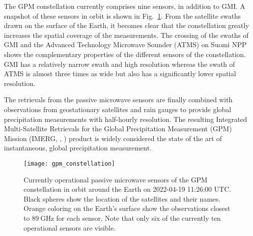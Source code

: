 The GPM constellation currently comprises nine sensors, in addition to GMI. A
snapshot of these sensors in orbit is shown in
Fig.~\ref{fig:radiative_transfer:gpm_constellation}. From the satellite swaths
drawn on the surface of the Earth, it becomes clear that the constellation
greatly increases the spatial coverage of the measurements. The crossing of the
swaths of GMI and the Advanced Technology Microwave Sounder (ATMS) on Suomi NPP
shows the complementary properties of the different sensors of the
constellation. GMI has a relatively narrow swath and high resolution whereas the
swath of ATMS is almost three times as wide but also has a significantly lower
spatial resolution.

The retrievals from the passive microwave sensors are finally combined with
observations from geostationary satellites and rain gauges to provide global
precipitation measurements with half-hourly resolution. The resulting Integrated
Multi-Satellite Retrievals for the Global Precipitation Measurement (GPM)
Mission (IMERG, \citeauthor{huffman20}, \citeyear{huffman20}) product is widely
considered the state of the art of instantaneous, global precipitation
measurement.


\begin{figure}[!hbpt]
\centering
\texttt{[image: gpm\_constellation]}
\caption{
Currently operational passive microwave sensors of the GPM constellation in
orbit around the Earth on 2022-04-19 11:26:00 UTC. Black spheres show the
location of the satellites and their names. Orange coloring on the Earth's
surface show the observations closest to $\SI{89}{\giga \hertz}$ for each
sensor. Note that only six of the currently ten operational sensors are visible.
}
\label{fig:radiative_transfer:gpm_constellation}
\end{figure}




